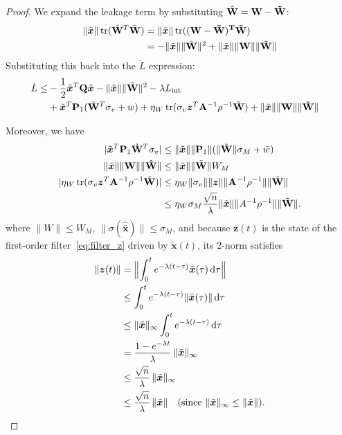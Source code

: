 \documentclass[11pt, a4paper]{article}
\newcommand{\tr}{\operatorname{tr}}
\newcommand{\xtilde}{\tilde{\bm{x}}}
\newcommand{\xhatbar}{\hat{\bar{\bm{x}}}}
\newcommand{\Wtilde}{\tilde{\mathbf{W}}}
\newcommand{\What}{\hat{\mathbf{W}}}
\begin{document}
\begin{proof}
We expand the leakage term by substituting $\What =\bf{W} - \Wtilde$:
\begin{align*}
    \|\xtilde\| \tr(\What^T\Wtilde) &= \|\xtilde\| \tr((\bf{W} - \Wtilde)^T\Wtilde)\\&= -\|\xtilde\| \|\Wtilde\|^{2}+\|\xtilde\| \|\bf{W}\|\|\Wtilde\|
\end{align*}
Substituting this back into the $\dot{L}$ expression:
\begin{align*}
    \dot{L} \le &-\frac{1}{2}\xtilde^T\mathbf{Q}\xtilde  -\|\xtilde\| \|\Wtilde\|^{2} - \lambda L_{\text{int}} \quad \text{\small } \\
    & + \xtilde^T\mathbf{P}_1 (\Wtilde^T \sigma_v + w)+ \eta_W \tr(\sigma_v \bm{z}^T \mathbf{A}^{-1} \rho^{-1}\Wtilde) +  \|\xtilde\| \|\bf{W}\|\|\Wtilde\| \quad \text{\small}
\end{align*}

Moreover, we have
\begin{align*}
    |\xtilde^T\mathbf{P}_1 \Wtilde^T \sigma_v| &\le \|\xtilde\|\|\mathbf{P}_1\|(\|\Wtilde\| \sigma_{M} + \bar{w})\\
    \|\xtilde\| \|\bf{W}\|\|\What\| &\le \|\xtilde\|\|\Wtilde\| W_M \\
        |\eta_W \tr(\sigma_v \bm{z}^T\mathbf{A}^{-1} \rho^{-1}\Wtilde)|
    &\le \eta_W \|\sigma_v\| \|\bm{z}\| \|\mathbf{A}^{-1} \rho^{-1}\| \|\Wtilde\| \\
    &\le \eta_W \sigma_M \frac{\sqrt{n}}{\lambda} \|\xtilde\| \|A^{-1} \rho^{-1}\| \|\Wtilde\|. \\
\end{align*}
where $\|W\|\le W_M$, $\|\sigma(\xhatbar)\|\le \sigma_M$, and
because $\bm z(t)$ is the state of the first-order filter~\eqref{eq:filter_z}
driven by $\xtilde(t)$, its 2-norm satisfies
\begin{align}
    \|\bm z(t)\|
    &= \Bigl\| \int_{0}^{t} e^{-\lambda(t-\tau)} \xtilde(\tau)\,\mathrm d\tau \Bigr\| \notag\\
    &\le \int_{0}^{t} e^{-\lambda(t-\tau)} \|\xtilde(\tau)\|\,\mathrm d\tau \notag\\
    &\le \|\xtilde\|_{\infty} \int_{0}^{t} e^{-\lambda(t-\tau)}\,\mathrm d\tau \notag\\
    &= \frac{1-e^{-\lambda t}}{\lambda}\,\|\xtilde\|_{\infty} \notag\\
    &\le \frac{\sqrt{n}}{\lambda}\,\|\xtilde\|_{\infty} \notag\\
    &\le \frac{\sqrt{n}}{\lambda}\,\|\xtilde\| \quad (\text{since } \|\xtilde\|_{\infty}\le\|\xtilde\|).
\end{align}



\end{proof}
\end{document}
